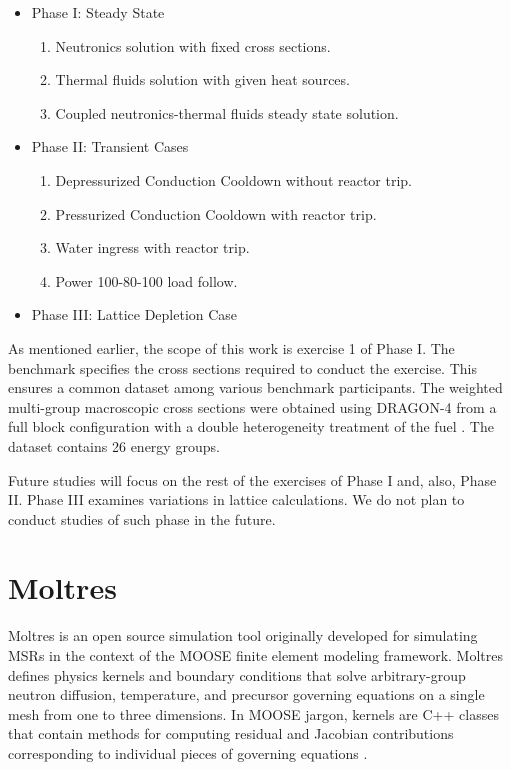 \documentclass{anstrans}
\begin{document}
\begin{itemize}
	\item Phase I: Steady State
        \begin{enumerate}
            \item Neutronics solution with fixed cross sections. 
            \item Thermal fluids solution with given heat sources.
            \item Coupled neutronics-thermal fluids steady state solution.
        \end{enumerate}

        \item Phase II: Transient Cases
        \begin{enumerate}
            \item Depressurized Conduction Cooldown without reactor trip.
            \item Pressurized Conduction Cooldown with reactor trip.
            \item Water ingress with reactor trip.
            \item Power 100-80-100 load follow.
        \end{enumerate}

        \item Phase III: Lattice Depletion Case

\end{itemize}

As mentioned earlier, the scope of this work is exercise 1 of Phase I.
The benchmark specifies the cross sections required to conduct the exercise.
This ensures a common dataset among various benchmark participants.
The weighted multi-group macroscopic cross sections were obtained using DRAGON-4 \cite{marleau_user_2016} from a full block configuration with a double heterogeneity treatment of the fuel \cite{oecd_nea_benchmark_2017}.
The dataset contains 26 energy groups.

Future studies will focus on the rest of the exercises of Phase I and, also, Phase II.
Phase III examines variations in lattice calculations.
We do not plan to conduct studies of such phase in the future.

\section{Moltres}

Moltres is an open source simulation tool originally developed for simulating \glspl{MSR} in the context of the \gls{MOOSE} finite element modeling framework.
Moltres defines physics kernels and boundary conditions that solve arbitrary-group neutron diffusion, temperature, and precursor governing equations on a single mesh from one to three dimensions.
In \gls{MOOSE} jargon, kernels are C++ classes that contain methods for computing residual and Jacobian contributions corresponding to individual pieces of governing equations \cite{lindsay_introduction_2018}.
\end{document}
